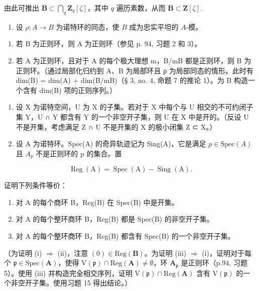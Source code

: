 由此可推出 \(\overline{\mathbf{B}}\subset\bigcap_{q}\mathbf{Z}_{q}[\zeta]\)，其中 \(q\) 遍历素数，从而 \(\overline{\mathbf{B}}\subset\mathbf{Z}[\zeta].\)

\begin{enumerate}
\def\labelenumi{\arabic{enumi})}
\setcounter{enumi}{13}
\tightlist
\item
  设 \(\rho: A \to B\) 为诺特环的同态，使 \(B\) 成为忠实平坦的 \(A\)-模。
\end{enumerate}

\begin{enumerate}
\def\labelenumi{\alph{enumi})}
\item
  若 B 为正则环，则 A 为正则环（参见 p. 94, 习题 2 和 3）。
\item
  若 A 为正则环，且对于 A 的每个极大理想 m，B/mB 都是正则环，则 B 为正则环。（通过局部化归约到 A、B 为局部环且 ρ 为局部同态的情形。此时有 dim(B) = dim(A) + dim(B/mB)（§ 3, no. 4, 命题 7 的推论 1）。为 B 构造一个含有 dim(B) 项的正则序列。）
\end{enumerate}

\begin{enumerate}
\def\labelenumi{\arabic{enumi})}
\setcounter{enumi}{14}
\item
  设 X 为诺特空间，U 为 X 的子集。若对于 X 中每个与 U 相交的不可约闭子集 Y，U ∩ Y 都含有 Y 的一个非空开子集，则 U 在 X 中是开的。（反设 U 不是开集，考虑满足 Z ∩ U 不是开集的 X 的极小闭集 Z ⊂ X。）
\item
  设 A 为诺特环。Spec(A) 的奇异轨迹记为 Sing(A)，它是满足 \(p \in \text{Spec}(A)\) 且 \(A_p\) 不是正则环的 p 的集合。置
\end{enumerate}

\[
\operatorname{Reg} (\mathrm{A}) = \operatorname{Spec} (\mathrm{A}) - \operatorname{Sing} (\mathrm{A}).
\]

证明下列条件等价：

\begin{enumerate}
\def\labelenumi{(\roman{enumi})}
\item
  对 A 的每个商环 B，Reg(B) 在 Spec(B) 中是开集。
\item
  对 A 的每个整环商环 B，Reg(B) 都是 Spec(B) 的非空开子集。
\item
  对 A 的每个整环商环 B，Reg(B) 都含有 Spec(B) 的一个非空开子集。
\end{enumerate}

（为证明 (i) \(\Rightarrow\) (ii)，注意 \((0)\in\mathrm{Reg}(\mathbf{B})\)。为证明 (iii) \(\Rightarrow\) (i)，证明对于每个 \(\mathfrak{p}\in\mathrm{Spec}(\mathbf{A})\)，使得 \(\mathrm{V}(\mathfrak{p})\cap\mathrm{Reg}(\mathbf{A})\neq\emptyset\)，环 \(\mathbf{A}_{\mathfrak{p}}\) 是正则环（p.94, 习题 5）。使用 (iii) 并构造完全相交序列，证明 \(\mathrm{V}(\mathfrak{p})\cap\mathrm{Reg}(\mathbf{A})\) 含有 \(\mathrm{V}(\mathfrak{p})\) 的一个非空开子集。使用习题 15 得出结论。）


